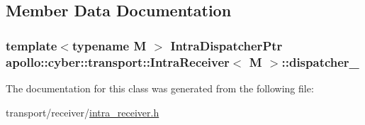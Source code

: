 \subsection{Member Data Documentation}
\hypertarget{classapollo_1_1cyber_1_1transport_1_1IntraReceiver_a92cf4ca8bb025023e5c7f5441c736dcd}{
\subsubsection[{dispatcher\-\_\-}]{\setlength{\rightskip}{0pt plus 5cm}template$<$typename M $>$ {\bf Intra\-Dispatcher\-Ptr} {\bf apollo\-::cyber\-::transport\-::\-Intra\-Receiver}$<$ M $>$\-::dispatcher\-\_\-\hspace{0.3cm}{\ttfamily [private]}}}\label{classapollo_1_1cyber_1_1transport_1_1IntraReceiver_a92cf4ca8bb025023e5c7f5441c736dcd}


The documentation for this class was generated from the following file\-:\begin{DoxyCompactItemize}
\item 
transport/receiver/\hyperlink{intra__receiver_8h}{intra\-\_\-receiver.\-h}\end{DoxyCompactItemize}
